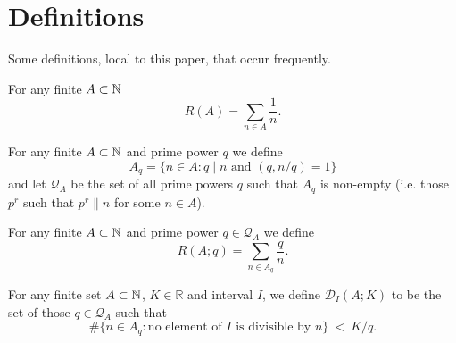 \chapter{Definitions}
\label{chap:def}

Some definitions, local to this paper, that occur frequently.

\begin{definition}
  \label{def:rec_sum}
  \leanok
  For any finite $A\subset \mathbb{N}$
  \[R(A)=\sum_{n\in A}\frac{1}{n}.\]
\end{definition}

\begin{definition}
  \label{def:local_part}
  \leanok
  For any finite $A\subset \mathbb{N}$ and prime power $q$ we define
  \[A_q = \{ n\in A : q\mid n\textrm{ and }(q,n/q)=1\}\]
  and let $\mathcal{Q}_A$ be the set of all prime powers $q$ such that $A_q$ is non-empty (i.e. those $p^r$ such that $p^r\| n$ for some $n\in A$).
\end{definition}

\begin{definition}
  \label{def:rec_sum_local}
  \leanok
  For any finite $A\subset \mathbb{N}$ and prime power $q\in\mathcal{Q}_A$ we define
  \[R(A;q) = \sum_{n\in A_q}\frac{q}{n}.\]
\end{definition}

\begin{definition}
  \label{def:interval_rare_ppowers}
  \leanok
  For any finite set $A\subset \mathbb{N}$, $K\in \mathbb{R}$ and interval $I$, we define $\mathcal{D}_I(A;K)$ to be the set of those $q\in\mathcal{Q}_A$ such that
  \[\#\{ n\in A_q: \textrm{no element of }I\textrm{ is divisible by }n\}\ <\ K / q.\]
\end{definition}
